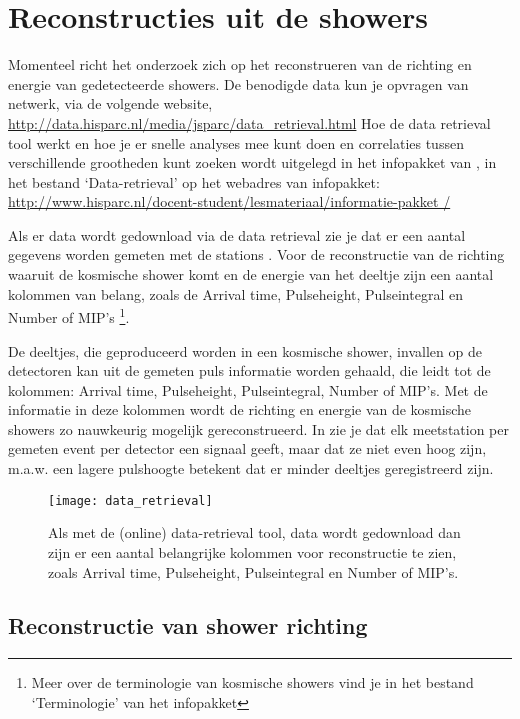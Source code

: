 \section{Reconstructies uit de showers}

Momenteel richt het \hisparc onderzoek zich op het reconstrueren
van de richting  en energie van gedetecteerde showers. De benodigde data kun je opvragen
van \hisparc netwerk, via de volgende website,
\url{http://data.hisparc.nl/media/jsparc/data_retrieval.html} Hoe de
data retrieval tool werkt en hoe je er snelle analyses mee kunt doen en
correlaties tussen verschillende grootheden kunt zoeken wordt uitgelegd
in het infopakket van \hisparc, in het bestand `Data-retrieval' op het
webadres van infopakket:
\url{http://www.hisparc.nl/docent-student/lesmateriaal/informatie-pakket
/}

Als er data wordt gedownload via de data retrieval zie je dat er een aantal 
gegevens worden gemeten met de stations . Voor de 
reconstructie van de richting waaruit de kosmische shower komt en de energie 
van het deeltje zijn een aantal kolommen van belang, zoals de Arrival time,
Pulseheight, Pulseintegral en Number of MIP's \footnote{Meer over de terminologie 
van kosmische showers vind je in het bestand `Terminologie' van het infopakket}.

De deeltjes, die geproduceerd worden in een kosmische shower, invallen op de 
detectoren kan uit de gemeten puls informatie worden gehaald, die leidt tot de 
kolommen: Arrival time, Pulseheight, Pulseintegral, Number of MIP's.
Met de informatie in deze kolommen wordt de richting en energie van de kosmische
showers zo nauwkeurig mogelijk gereconstrueerd. In  zie je 
dat elk meetstation per gemeten event per detector een signaal geeft, maar 
dat ze niet even hoog zijn, m.a.w. een lagere pulshoogte betekent dat er 
minder deeltjes geregistreerd 
zijn.
 

\begin{figure}
    \centering
    \texttt{[image: data\_retrieval]}
    \caption{Als met de (online) data-retrieval tool, data wordt gedownload dan zijn 
    er een aantal belangrijke kolommen voor reconstructie te zien, zoals Arrival time, 
    Pulseheight, Pulseintegral en Number of MIP's.}
    \label{fig:data_retrieval}
\end{figure}

\subsection{Reconstructie van shower richting}

